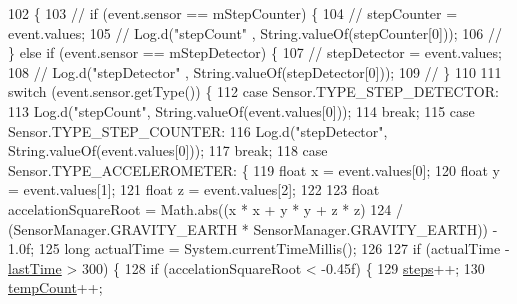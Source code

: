 \begin{DoxyCode}
102                                                    \{
103 \textcolor{comment}{//        if (event.sensor == mStepCounter) \{}
104 \textcolor{comment}{//            stepCounter = event.values;}
105 \textcolor{comment}{//            Log.d("stepCount" , String.valueOf(stepCounter[0]));}
106 \textcolor{comment}{//        \} else if (event.sensor == mStepDetector) \{}
107 \textcolor{comment}{//            stepDetector = event.values;}
108 \textcolor{comment}{//            Log.d("stepDetector" , String.valueOf(stepDetector[0]));}
109 \textcolor{comment}{//        \}}
110 
111         \textcolor{keywordflow}{switch} (event.sensor.getType()) \{
112             \textcolor{keywordflow}{case} Sensor.TYPE\_STEP\_DETECTOR:
113                 Log.d(\textcolor{stringliteral}{"stepCount"}, String.valueOf(event.values[0]));
114                 \textcolor{keywordflow}{break};
115             \textcolor{keywordflow}{case} Sensor.TYPE\_STEP\_COUNTER:
116                 Log.d(\textcolor{stringliteral}{"stepDetector"}, String.valueOf(event.values[0]));
117                 \textcolor{keywordflow}{break};
118             \textcolor{keywordflow}{case} Sensor.TYPE\_ACCELEROMETER: \{
119                 \textcolor{keywordtype}{float} x = \textcolor{keyword}{event}.values[0];
120                 \textcolor{keywordtype}{float} y = \textcolor{keyword}{event}.values[1];
121                 \textcolor{keywordtype}{float} z = \textcolor{keyword}{event}.values[2];
122 
123                 \textcolor{keywordtype}{float} accelationSquareRoot = Math.abs((x * x + y * y + z * z)
124                         / (SensorManager.GRAVITY\_EARTH * SensorManager.GRAVITY\_EARTH)) - 1.0f;
125                 \textcolor{keywordtype}{long} actualTime = System.currentTimeMillis();
126 
127                 \textcolor{keywordflow}{if} (actualTime - \hyperlink{classit_1_1unibo_1_1torsello_1_1bluetoothpositioning_1_1fragment_1_1oldFragment_1_1CountPassFragment_a0b2cb1d00e5c90bf8edc6997aee6fb2e_a0b2cb1d00e5c90bf8edc6997aee6fb2e}{lastTime} > 300) \{
128                     \textcolor{keywordflow}{if} (accelationSquareRoot < -0.45f) \{
129                         \hyperlink{classit_1_1unibo_1_1torsello_1_1bluetoothpositioning_1_1fragment_1_1oldFragment_1_1CountPassFragment_a61757f08791ab239bac96f4a086b8d44_a61757f08791ab239bac96f4a086b8d44}{steps}++;
130                         \hyperlink{classit_1_1unibo_1_1torsello_1_1bluetoothpositioning_1_1fragment_1_1oldFragment_1_1CountPassFragment_a2587f4727a7290c2252e88ebfd10a56e_a2587f4727a7290c2252e88ebfd10a56e}{tempCount}++;

\end{DoxyCode}
